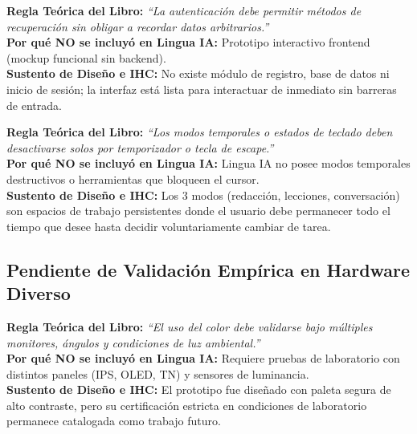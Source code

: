 \documentclass[10pt,a4paper]{article}
\begin{document}
\begin{tcolorbox}[excludedbox, title={C7.11 -- Permitir autenticación sin datos arbitrarios \hfill \colorbox{linguaRed}{\scriptsize\textbf{EXCLUIDO}}}]
\small
\textbf{Regla Teórica del Libro:} \textit{``La autenticación debe permitir métodos de recuperación sin obligar a recordar datos arbitrarios.''}\\
\textbf{Por qué NO se incluyó en Lingua IA:} Prototipo interactivo frontend (mockup funcional sin backend).\\
\textbf{Sustento de Diseño e IHC:} No existe módulo de registro, base de datos ni inicio de sesión; la interfaz está lista para interactuar de inmediato sin barreras de entrada.
\end{tcolorbox}

\begin{tcolorbox}[excludedbox, title={C8.11 -- Revertir automáticamente los modos especiales \hfill \colorbox{linguaRed}{\scriptsize\textbf{EXCLUIDO}}}]
\small
\textbf{Regla Teórica del Libro:} \textit{``Los modos temporales o estados de teclado deben desactivarse solos por temporizador o tecla de escape.''}\\
\textbf{Por qué NO se incluyó en Lingua IA:} Lingua IA no posee modos temporales destructivos o herramientas que bloqueen el cursor.\\
\textbf{Sustento de Diseño e IHC:} Los 3 modos (redacción, lecciones, conversación) son espacios de trabajo persistentes donde el usuario debe permanecer todo el tiempo que desee hasta decidir voluntariamente cambiar de tarea.
\end{tcolorbox}


\subsection*{Pendiente de Validación Empírica en Hardware Diverso}

\begin{tcolorbox}[excludedbox, title={C4.7 -- Considerar las condiciones externas de visualización \hfill \colorbox{linguaRed}{\scriptsize\textbf{EXCLUIDO}}}]
\small
\textbf{Regla Teórica del Libro:} \textit{``El uso del color debe validarse bajo múltiples monitores, ángulos y condiciones de luz ambiental.''}\\
\textbf{Por qué NO se incluyó en Lingua IA:} Requiere pruebas de laboratorio con distintos paneles (IPS, OLED, TN) y sensores de luminancia.\\
\textbf{Sustento de Diseño e IHC:} El prototipo fue diseñado con paleta segura de alto contraste, pero su certificación estricta en condiciones de laboratorio permanece catalogada como trabajo futuro.
\end{tcolorbox}
\end{document}
